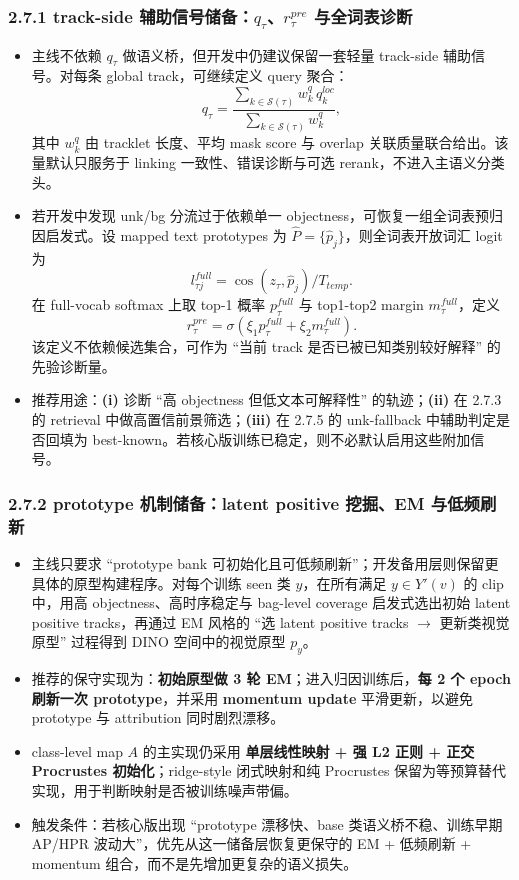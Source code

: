 \documentclass[UTF8]{ctexart}
\begin{document}
\subsubsection*{2.7.1 track-side 辅助信号储备：$q_\tau$、$r_\tau^{pre}$ 与全词表诊断}
\begin{itemize}
\item 主线不依赖 $q_\tau$ 做语义桥，但开发中仍建议保留一套轻量 track-side 辅助信号。对每条 global track，可继续定义 query 聚合：
\[
 q_\tau = \frac{\sum_{k\in \mathcal S(\tau)} w_k^{q} \, q_k^{loc}}{\sum_{k\in \mathcal S(\tau)} w_k^{q}},
\]
其中 $w_k^{q}$ 由 tracklet 长度、平均 mask score 与 overlap 关联质量联合给出。该量默认只服务于 linking 一致性、错误诊断与可选 rerank，不进入主语义分类头。
\item 若开发中发现 unk/bg 分流过于依赖单一 objectness，可恢复一组全词表预归因启发式。设 mapped text prototypes 为 $\hat P=\{\hat p_j\}$，则全词表开放词汇 logit 为
\[
 l_{\tau j}^{full}=\cos(z_\tau,\hat p_j)/T_{temp}.
\]
在 full-vocab softmax 上取 top-1 概率 $p_\tau^{full}$ 与 top1-top2 margin $m_\tau^{full}$，定义
\[
 r_\tau^{pre}=\sigma\!\left(\xi_1 p_\tau^{full}+\xi_2 m_\tau^{full}\right).
\]
该定义不依赖候选集合，可作为 ``当前 track 是否已被已知类别较好解释'' 的先验诊断量。
\item 推荐用途：\textbf{(i)} 诊断 ``高 objectness 但低文本可解释性'' 的轨迹；\textbf{(ii)} 在 2.7.3 的 retrieval 中做高置信前景筛选；\textbf{(iii)} 在 2.7.5 的 unk-fallback 中辅助判定是否回填为 best-known。若核心版训练已稳定，则不必默认启用这些附加信号。
\end{itemize}

\subsubsection*{2.7.2 prototype 机制储备：latent positive 挖掘、EM 与低频刷新}
\begin{itemize}
\item 主线只要求 ``prototype bank 可初始化且可低频刷新''；开发备用层则保留更具体的原型构建程序。对每个训练 seen 类 $y$，在所有满足 $y\in Y'(v)$ 的 clip 中，用高 objectness、高时序稳定与 bag-level coverage 启发式选出初始 latent positive tracks，再通过 EM 风格的 ``选 latent positive tracks $\rightarrow$ 更新类视觉原型'' 过程得到 DINO 空间中的视觉原型 $p_y$。
\item 推荐的保守实现为：\textbf{初始原型做 3 轮 EM}；进入归因训练后，\textbf{每 2 个 epoch 刷新一次 prototype}，并采用 \textbf{momentum update} 平滑更新，以避免 prototype 与 attribution 同时剧烈漂移。
\item class-level map $A$ 的主实现仍采用 \textbf{单层线性映射 + 强 L2 正则 + 正交 Procrustes 初始化}；ridge-style 闭式映射和纯 Procrustes 保留为等预算替代实现，用于判断映射是否被训练噪声带偏。
\item 触发条件：若核心版出现 ``prototype 漂移快、base 类语义桥不稳、训练早期 AP/HPR 波动大''，优先从这一储备层恢复更保守的 EM + 低频刷新 + momentum 组合，而不是先增加更复杂的语义损失。
\end{itemize}
\end{document}
